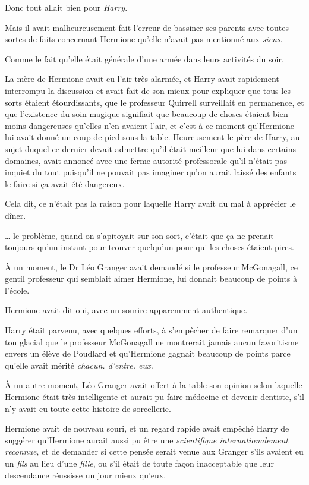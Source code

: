 Donc tout allait bien pour \emph{Harry}.

Mais il avait malheureusement fait l'erreur de bassiner ses parents avec toutes sortes de faits concernant Hermione qu'elle n'avait pas mentionné aux \emph{siens}.

Comme le fait qu'elle était générale d'une armée dans leurs activités du soir.

La mère de Hermione avait eu l'air très alarmée, et Harry avait rapidement interrompu la discussion et avait fait de son mieux pour expliquer que tous les sorts étaient étourdissants, que le professeur Quirrell surveillait en permanence, et que l'existence du soin magique signifiait que beaucoup de choses étaient bien moins dangereuses qu'elles n'en avaient l'air, et c'est à ce moment qu'Hermione lui avait donné un coup de pied sous la table.
Heureusement le père de Harry, au sujet duquel ce dernier devait admettre qu'il était meilleur que lui dans certains domaines, avait annoncé avec une ferme autorité professorale qu'il n'était pas inquiet du tout puisqu'il ne pouvait pas imaginer qu'on aurait laissé des enfants le faire si ça avait été dangereux.

Cela dit, ce n'était pas la raison pour laquelle Harry avait du mal à apprécier le dîner.

… le problème, quand on s'apitoyait sur son sort, c'était que ça ne prenait toujours qu'un instant pour trouver quelqu'un pour qui les choses étaient pires.

À un moment, le Dr Léo Granger avait demandé si le professeur McGonagall, ce gentil professeur qui semblait aimer Hermione, lui donnait beaucoup de points à l'école.

Hermione avait dit oui, avec un sourire apparemment authentique.

Harry était parvenu, avec quelques efforts, à s'empêcher de faire remarquer d'un ton glacial que le professeur McGonagall ne montrerait jamais aucun favoritisme envers un élève de Poudlard et qu'Hermione gagnait beaucoup de points parce qu'elle avait mérité \emph{chacun. d'entre. eux.}

À un autre moment, Léo Granger avait offert à la table son opinion selon laquelle Hermione était très intelligente et aurait pu faire médecine et devenir dentiste, s'il n'y avait eu toute cette histoire de sorcellerie.

Hermione avait de nouveau souri, et un regard rapide avait empêché Harry de suggérer qu'Hermione aurait aussi pu être une \emph{scientifique internationalement reconnue}, et de demander si cette pensée serait venue aux Granger s'ils avaient eu un \emph{fils} au lieu d'une \emph{fille}, ou s'il était de toute façon inacceptable que leur descendance réussisse un jour mieux qu'eux.


